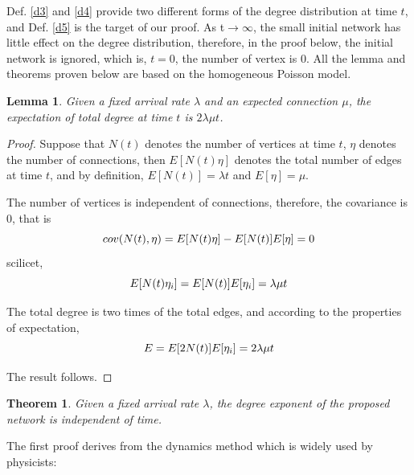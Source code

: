 \documentclass[final]{IEEEtran}
\newtheorem{theorem}{Theorem}
\begin{document}
Def. \ref{d3} and \ref{d4} provide two different forms of the
degree distribution at time $t$, and Def. \ref{d5} is the target
of our proof. As t$\rightarrow$$\infty$, the small initial network
has little effect on the degree distribution, therefore, in the
proof below, the initial network is ignored, which is, $t$$=$$0$,
the number of vertex is $0$. All the lemma and theorems proven
below are based on the homogeneous Poisson model.

\newtheorem{lemma}{Lemma}
\begin{lemma}\label{l1}
Given a fixed arrival rate $\lambda$ and an expected connection
$\mu$, the expectation of total degree at time $t$ is $2\lambda
\mu t$.
\end{lemma}
\begin{proof}
Suppose that $N(t)$ denotes the number of vertices at time $t$,
$\eta$ denotes the number of connections, then $E[N(t)\eta]$
denotes the total number of edges at time $t$, and by definition,
$E[N(t)]$$=$$\lambda t$ and $E[\eta]$$=$$\mu$.

The number of vertices is independent of connections, therefore,
the covariance is $0$, that is
\begin{equation}\footnotesize
cov(N(t),\eta)=E[N(t)\eta]-E[N(t)]E[\eta]=0
\end{equation}
scilicet,
\begin{equation}\footnotesize
E[N(t)\eta_{i}]=E[N(t)]E[\eta_{i}]=\lambda\mu t
\end{equation}

The total degree is two times of the total edges, and according to
the properties of expectation,
\begin{equation}\footnotesize
E=E[2N(t)]E[\eta_{i}]=2\lambda\mu t
\end{equation}

The result follows.

\end{proof}

\begin{theorem}\label{t1}
Given a fixed arrival rate $\lambda$, the degree exponent of the
proposed network is independent of time.
\end{theorem}

The first proof derives from the dynamics method which is widely
used by physicists:
\end{document}
